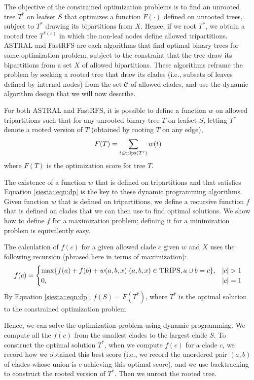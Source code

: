 The objective of the constrained optimization problems is to find an unrooted tree $T^*$ on leafset $S$ that optimizes a function $F(\cdot)$ defined on unrooted trees, subject to $T^*$ drawing its bipartitions from $X$.
Hence, if we root $T^*$, we obtain a rooted tree $T^{*(r)}$ in which the non-leaf nodes define allowed tripartitions. 
ASTRAL and FastRFS are each algorithms that find optimal binary trees for some optimization problem,   subject to the constraint that the tree draw its bipartitions from a set $X$ of allowed bipartitions. 
These algorithms reframe the problem by seeking a rooted tree that draw its clades (i.e., subsets of leaves defined by internal nodes) from the set $\mathcal{C}$ of allowed clades, and use the dynamic algorithm design that we will now describe.

For both ASTRAL and FastRFS, it is possible to define a function $w$ on allowed tripartitions such that for any unrooted binary tree $T$ on leafset $S$, letting $T^{r}$ denote a rooted version of $T$ (obtained by rooting $T$ on any edge), 
\begin{equation}
\label{siesta::eqn:dp}
F(T) = \sum_{t \in \mathop{\rm trips}(T^{r}) } w(t)
\end{equation}
where $F(T)$ is the optimization score for tree $T$.

The existence of a function $w$ that is defined on tripartitions and that satisfies Equation \ref{siesta::eqn:dp} is the key to these dynamic programming algorithms.
Given function $w$ that is defined on tripartitions, we define a recursive function $f$ that is defined on clades that we can then use to find optimal solutions. 
We show how to define $f$ for  a maximization problem; defining it for a minimization problem is equivalently easy.


The calculation of $f(c)$ for a given allowed clade $c$ given $w$ and $X$ uses the following recursion (phrased here in terms of maximization): 
\[
f(c) = 
\begin{cases}
\max \{ f(a) + f (b) + w(a,b,x)  | (a,b,x) \in \mathop{\rm TRIPS}, a \cup b = c\},  & |c|>1 
\\
 0, & |c|=1
\end{cases}
\]
By Equation \ref{siesta::eqn:dp}, $f(S) = F(T^*)$, where $T^*$ is the optimal solution to the constrained optimization problem.

Hence, we can solve the optimization problem using dynamic programming.
We compute all the $f(c)$ from the smallest clades to the largest clade $S$. 
To construct the optimal solution $T^*$,  when we compute $f(c)$ for a clade $c$, we record how we obtained this best score (i.e., we record the unordered pair $(a,b)$ of clades whose union is $c$ achieving this optimal score), and we use backtracking to construct the rooted version of $T^*$.
Then we unroot the rooted tree.

